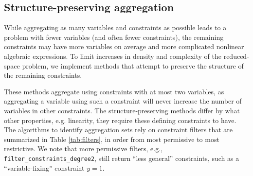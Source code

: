 \documentclass[smallextended]{svjour3}
\begin{document}
\begin{table}
  \centering
  \caption{Subroutines used to filter constraints}
  \label{tab:filters}
\end{table}

\subsection{Structure-preserving aggregation}

While aggregating as many variables and constraints as possible leads to a problem
with fewer variables (and often fewer constraints), the remaining constraints may
have more variables on average and more complicated nonlinear algebraic expressions.
To limit increases in density and complexity of the reduced-space problem, we
implement methods that attempt to preserve the structure of the remaining constraints.

These methods aggregate using constraints with at most two variables, as aggregating
a variable using such a constraint will never increase the number of variables in
other constraints. The structure-preserving methods differ by what other properties,
e.g. linearity, they require these defining constraints to have.
The algorithms to identify aggregation sets rely on constraint filters that are
summarized in Table \ref{tab:filters}, in order from most permissive to most
restrictive. We note that more permissive filters, e.g., {\tt filter\_constraints\_degree2},
still return ``less general'' constraints, such as a ``variable-fixing'' constraint $y=1$.
\end{document}

